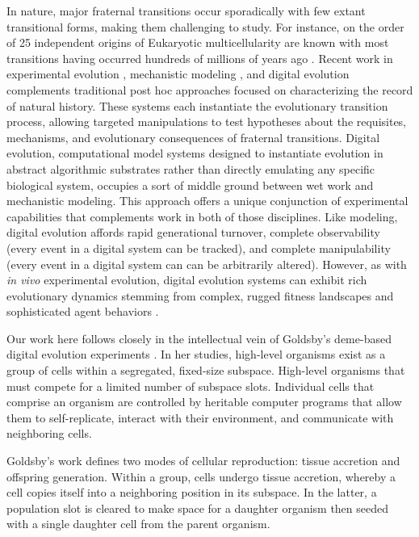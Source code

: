 In nature, major fraternal transitions occur sporadically with few extant transitional forms, making them challenging to study.
For instance, on the order of 25 independent origins of Eukaryotic multicellularity are known \citep{grosberg2007evolution} with most transitions having occurred hundreds of millions of years ago \citep{libby2014ratcheting}.
Recent work in experimental evolution \citep{ratcliff2014experimental, ratcliff2015origins, gulli2019evolution, koschwanez2013improved}, mechanistic modeling \citep{hanschen2015evolutionary, staps2019emergence}, and digital evolution \citep{goldsby2012task, goldsby2014evolutionary} complements traditional post hoc approaches focused on characterizing the record of natural history.
These systems each instantiate the evolutionary transition process, allowing targeted manipulations to test hypotheses about the requisites, mechanisms, and evolutionary consequences of fraternal transitions.
Digital evolution, computational model systems designed to instantiate evolution in abstract algorithmic substrates rather than directly emulating any specific biological system, occupies a sort of middle ground between wet work and mechanistic modeling.
This approach offers a unique conjunction of experimental capabilities that complements work in both of those disciplines.
Like modeling, digital evolution affords rapid generational turnover, complete observability (every event in a digital system can be tracked), and complete manipulability (every event in a digital system can can be arbitrarily altered).
However, as with \textit{in vivo} experimental evolution, digital evolution systems can exhibit rich evolutionary dynamics stemming from complex, rugged fitness landscapes \citep{labar2017evolution} and sophisticated agent behaviors \citep{grabowski2013case}.

Our work here follows closely in the intellectual vein of Goldsby's deme-based digital evolution experiments \citep{goldsby2012task, goldsby2014evolutionary}.
In her studies, high-level organisms exist as a group of cells within a segregated, fixed-size subspace.
High-level organisms that must compete for a limited number of subspace slots.
Individual cells that comprise an organism are controlled by heritable computer programs that allow them to self-replicate, interact with their environment, and communicate with neighboring cells.

Goldsby's work defines two modes of cellular reproduction: tissue accretion and offspring generation.
Within a group, cells undergo tissue accretion, whereby a cell copies itself into a neighboring position in its subspace.
In the latter, a population slot is cleared to make space for a daughter organism then seeded with a single daughter cell from the parent organism.

